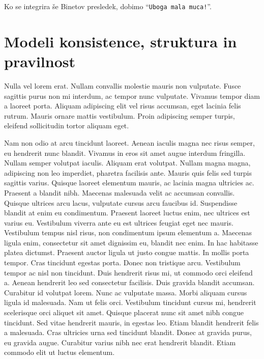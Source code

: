 \documentclass[a4paper, 12pt, twoside]{book}
\begin{document}
Ko se integrira še Binetov presledek, dobimo “{\tt Uboga mala muca!}”.

\chapter{Modeli konsistence, struktura in pravilnost}

Nulla vel lorem erat. Nullam convallis molestie mauris non vulputate. Fusce sagittis purus non mi interdum, ac tempor nunc vulputate. Vivamus tempor diam a laoreet porta. Aliquam adipiscing elit vel risus accumsan, eget lacinia felis rutrum. Mauris ornare mattis vestibulum. Proin adipiscing semper turpis, eleifend sollicitudin tortor aliquam eget.

Nam non odio at arcu tincidunt laoreet. Aenean iaculis magna nec risus semper, eu hendrerit nunc blandit. Vivamus in eros sit amet augue interdum fringilla. Nullam semper volutpat iaculis. Aliquam erat volutpat. Nullam magna magna, adipiscing non leo imperdiet, pharetra facilisis ante. Mauris quis felis sed turpis sagittis varius. Quisque laoreet elementum mauris, ac lacinia magna ultricies ac. Praesent a blandit nibh. Maecenas malesuada velit ac accumsan convallis. Quisque ultrices arcu lacus, vulputate cursus arcu faucibus id. Suspendisse blandit at enim eu condimentum. Praesent laoreet luctus enim, nec ultrices est varius eu. Vestibulum viverra ante eu est ultrices feugiat eget nec mauris. Vestibulum tempus nisl risus, non condimentum ipsum elementum a. Maecenas ligula enim, consectetur sit amet dignissim eu, blandit nec enim. In hac habitasse platea dictumst. Praesent auctor ligula ut justo congue mattis. In mollis porta tempor. Cras tincidunt egestas porta. Donec non tristique arcu. Vestibulum tempor ac nisl non tincidunt. Duis hendrerit risus mi, ut commodo orci eleifend a. Aenean hendrerit leo sed consectetur facilisis. Duis gravida blandit accumsan. Curabitur id volutpat lorem. Nunc ac vulputate massa. Morbi aliquam cursus ligula id malesuada. Nam ut felis orci. Vestibulum tincidunt cursus mi, hendrerit scelerisque orci aliquet sit amet. Quisque placerat nunc sit amet nibh congue tincidunt. Sed vitae hendrerit mauris, in egestas leo. Etiam blandit hendrerit felis a malesuada. Cras ultricies urna sed tincidunt blandit. Donec at gravida purus, eu gravida augue. Curabitur varius nibh nec erat hendrerit blandit. Etiam commodo elit ut luctus elementum.

\end{document}
